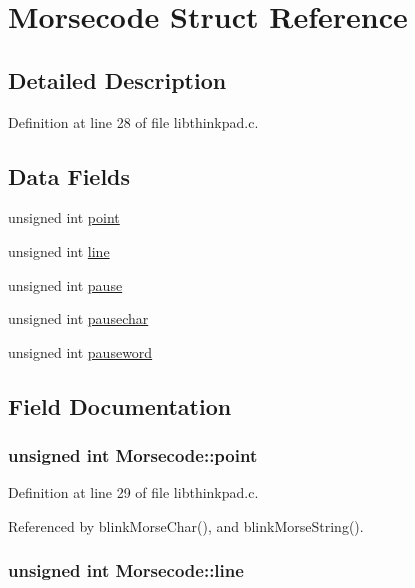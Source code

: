 \hypertarget{structMorsecode}{
\section{Morsecode Struct Reference}
\label{structMorsecode}
}


\subsection{Detailed Description}


Definition at line 28 of file libthinkpad.c.\subsection*{Data Fields}
\begin{CompactItemize}
\item 
unsigned int \hyperlink{structMorsecode_8b086104ea8a3f7607506a8c83b73bfb}{point}
\item 
unsigned int \hyperlink{structMorsecode_b311430da7c2a478a34f72bdf8aa3206}{line}
\item 
unsigned int \hyperlink{structMorsecode_ab2bdcbe47e1574b123de1b446cb5437}{pause}
\item 
unsigned int \hyperlink{structMorsecode_e2cd11cab14de8e29d67bcd8557e9e56}{pausechar}
\item 
unsigned int \hyperlink{structMorsecode_b8003369db1fa07cff2ccfcd2928104e}{pauseword}
\end{CompactItemize}


\subsection{Field Documentation}
\hypertarget{structMorsecode_8b086104ea8a3f7607506a8c83b73bfb}{
\subsubsection{\setlength{\rightskip}{0pt plus 5cm}unsigned int {\bf Morsecode::point}}}
\label{structMorsecode_8b086104ea8a3f7607506a8c83b73bfb}




Definition at line 29 of file libthinkpad.c.

Referenced by blinkMorseChar(), and blinkMorseString().\hypertarget{structMorsecode_b311430da7c2a478a34f72bdf8aa3206}{
\subsubsection{\setlength{\rightskip}{0pt plus 5cm}unsigned int {\bf Morsecode::line}}}
\label{structMorsecode_b311430da7c2a478a34f72bdf8aa3206}




